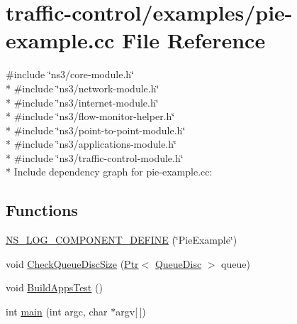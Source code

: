 \hypertarget{pie-example_8cc}{}\section{traffic-\/control/examples/pie-\/example.cc File Reference}
\label{pie-example_8cc}
{\ttfamily \#include \char`\"{}ns3/core-\/module.\+h\char`\"{}}\\*
{\ttfamily \#include \char`\"{}ns3/network-\/module.\+h\char`\"{}}\\*
{\ttfamily \#include \char`\"{}ns3/internet-\/module.\+h\char`\"{}}\\*
{\ttfamily \#include \char`\"{}ns3/flow-\/monitor-\/helper.\+h\char`\"{}}\\*
{\ttfamily \#include \char`\"{}ns3/point-\/to-\/point-\/module.\+h\char`\"{}}\\*
{\ttfamily \#include \char`\"{}ns3/applications-\/module.\+h\char`\"{}}\\*
{\ttfamily \#include \char`\"{}ns3/traffic-\/control-\/module.\+h\char`\"{}}\\*
Include dependency graph for pie-\/example.cc\+:
\subsection*{Functions}
\begin{DoxyCompactItemize}
\item 
\hyperlink{pie-example_8cc_a40a2488cf4393aeb41598de13af518f3}{N\+S\+\_\+\+L\+O\+G\+\_\+\+C\+O\+M\+P\+O\+N\+E\+N\+T\+\_\+\+D\+E\+F\+I\+NE} (\char`\"{}Pie\+Example\char`\"{})
\item 
void \hyperlink{pie-example_8cc_a64451d920062e967d2c0fa8b6ae85911}{Check\+Queue\+Disc\+Size} (\hyperlink{classns3_1_1Ptr}{Ptr}$<$ \hyperlink{classns3_1_1QueueDisc}{Queue\+Disc} $>$ queue)
\item 
void \hyperlink{pie-example_8cc_a0c000010f0a49a9809242c8ec4148666}{Build\+Apps\+Test} ()
\item 
int \hyperlink{pie-example_8cc_a0ddf1224851353fc92bfbff6f499fa97}{main} (int argc, char $\ast$argv\mbox{[}$\,$\mbox{]})
\end{DoxyCompactItemize}
